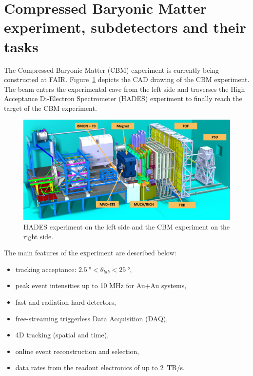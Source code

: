 

\section{Compressed Baryonic Matter experiment, subdetectors and their tasks}
The Compressed Baryonic Matter (\gls{CBM}) experiment is currently being constructed at \gls{FAIR}. Figure~\ref{fig:exp} depicts the CAD drawing of the \gls{CBM} experiment. The beam enters the experimental cave from the left side and traverses the High Acceptance Di-Electron Spectrometer (\gls{HADES}) experiment to finally reach the target of the \gls{CBM} experiment. 

\begin{figure}[!h]
    \centering
    \includegraphics[width=1\columnwidth]{Chapter1/images/CBMnew.png}
    \caption{HADES experiment on the left side and the \gls{CBM} experiment on the right side.}
    \label{fig:exp}
\end{figure}

The main features of the experiment are described below:
\begin{itemize}
\item tracking acceptance: $\SI{2.5}{\degree} < \theta_{lab} < \SI{25}{\degree}$,
\item peak event intensities up to 10 MHz for Au+Au systems,
\item fast and radiation hard detectors,
\item free-streaming triggerless Data Acquisition (\gls{DAQ}),
\item 4D tracking (spatial and time),
\item online event reconstruction and selection,
\item data rates from the readout electronics of up to 2~TB/s.
\end{itemize}


